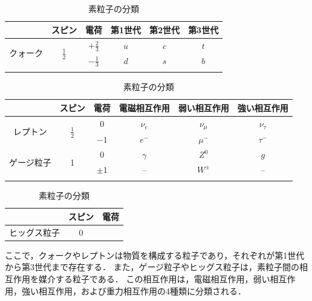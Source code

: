 \documentclass[uplatex,dvipdfmx,a4j,12pt]{jsarticle}
\begin{document}
\begin{table}[H]
  \centering
  \caption{素粒子の分類}
  \label{fig:particle}
  \begin{minipage}{\linewidth}
    \centering
    \begin{tabular}{cccccc}
      \hline
      & スピン & 電荷 & 第1世代 & 第2世代 & 第3世代 \\
      \hline\hline
      \multirow{2}{*}{クォーク} & \multirow{2}{*}{$\frac{1}{2}$} & $+\frac{2}{3}$ & $u$ & $c$ & $t$ \\
      & & $-\frac{1}{3}$ & $d$ & $s$ & $b$ \\
      \hline\\
    \end{tabular} 
  \end{minipage}

  \begin{minipage}{\linewidth}
    \centering
    \begin{tabular}{cccccc}
      \hline
      & スピン & 電荷 & 電磁相互作用 & 弱い相互作用 & 強い相互作用 \\
      \hline\hline
      \multirow{2}{*}{レプトン}  & \multirow{2}{*}{$\frac{1}{2}$} & 0 & $\nu_e$ & $\nu_\mu$ & $\nu_\tau$ \\
      & & $-1$ & $e^{-}$ & $\mu^{-}$ & $\tau^{-}$ \\
      \hline
      \multirow{2}{*}{ゲージ粒子} & \multirow{2}{*}{1} & 0 & $\gamma$ & $Z^0$ & $g$\\
      & & $\pm1$ & -- & $W^{\pm}$ & -- \\
      \hline\\
    \end{tabular}
  \end{minipage}

  \begin{minipage}{\linewidth}
    \centering
    \begin{tabular}{ccc}
      \hline
      & スピン & 電荷  \\ 
      \hline\hline
      ヒッグス粒子 & 0 \\
      \hline
    \end{tabular}
  \end{minipage}
\end{table}

ここで，クォークやレプトンは物質を構成する粒子であり，それぞれが第1世代から第3世代まで存在する．
また，ゲージ粒子やヒッグス粒子は，素粒子間の相互作用を媒介する粒子である．
この相互作用は，電磁相互作用，弱い相互作用，強い相互作用，および重力相互作用の4種類に分類される．
\end{document}
